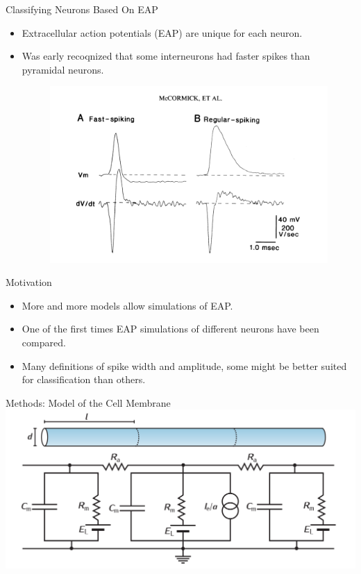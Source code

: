 \documentclass{beamer}
\begin{document}
\begin{frame}{Classifying Neurons Based On EAP}
    \begin{itemize}
        \item Extracellular action potentials (EAP) are unique for each neuron.
        \item Was early recoqnized that some interneurons had faster spikes than pyramidal
            neurons. 
        \begin{figure}
            \centering
            \includegraphics[height=0.5\textheight]{images/mc_cormick_fs_rs.png}\\
        \end{figure}
    \end{itemize}
\end{frame}

\begin{frame}{Motivation}
    \begin{itemize}
        \item More and more models allow simulations of EAP.
        \item One of the first times EAP simulations of different neurons have been compared.
        \item Many definitions of spike width and amplitude, some might be better suited
            for classification than others.
    \end{itemize}
\end{frame}

\begin{frame}{Methods: Model of the Cell Membrane}
    \centering
    \includegraphics[width=\textwidth]{images/compartment_circuit.png}
\end{frame}
\end{document}
